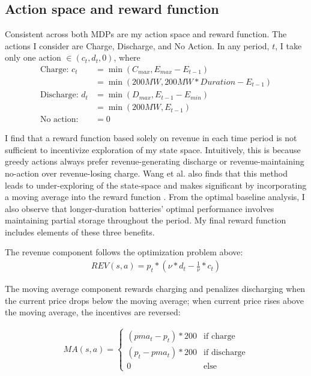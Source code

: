 \documentclass[conference]{IEEEtran}
\begin{document}
\subsection{Action space and reward function}
Consistent across both MDPs are my action space and reward function. The actions I consider are Charge, Discharge, and No Action. In any period, $t$, I take only one action $\in (c_t, d_t, 0)$, where
\begin{align*}
    \textrm{Charge: } c_t &= \min(C_{max}, E_{max} - E_{t-1})\\
    &= \min(200MW, 200MW*Duration - E_{t-1})\\
    \textrm{Discharge: } d_t &= \min(D_{max}, E_{t-1} - E_{min})\\
    &= \min(200MW, E_{t-1})\\
    \textrm{No action: } &= 0
\end{align*}

I find that a reward function based solely on revenue in each time period is not sufficient to incentivize exploration of my state space. Intuitively, this is because greedy actions always prefer revenue-generating discharge or revenue-maintaining no-action over revenue-losing charge. Wang et al. also finds that this method leads to under-exploring of the state-space and makes significant by incorporating a moving average into the reward function \cite{Wang}. From the optimal baseline analysis, I also observe that longer-duration batteries' optimal performance involves maintaining partial storage throughout the period. My final reward function includes elements of these three benefits. 

The revenue component follows the optimization problem above:
\begin{align}
    REV(s, a) = p_t * \left(\nu * d_t - \frac{1}{\nu}*c_t\right)
\end{align}

The moving average component rewards charging and penalizes discharging when the current price drops below the moving average; when current price rises above the moving average, the incentives are reversed:

\begin{align}
    MA(s, a) = \begin{cases}
        (pma_t - p_t) * 200 & \textrm{if charge}\\
        (p_t - pma_t) * 200 & \textrm{if discharge}\\
        0 & \textrm{else}
    \end{cases}
\end{align}
\end{document}
